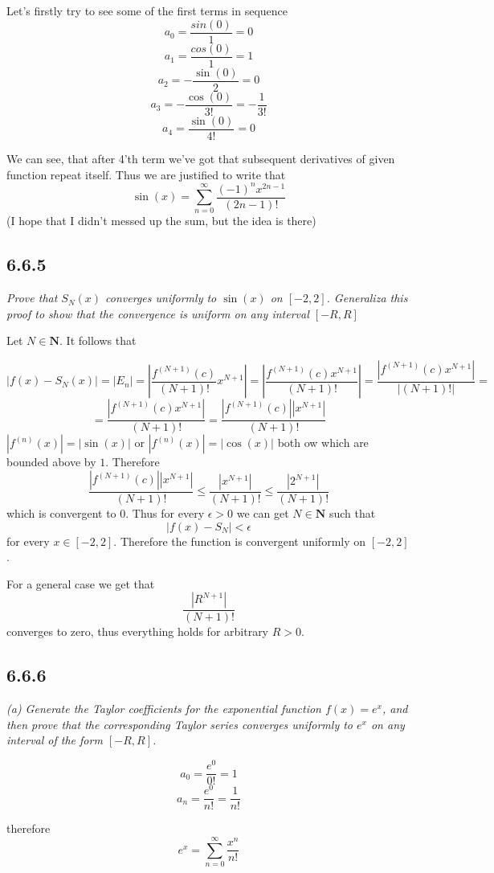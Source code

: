 \documentclass[11pt,oneside,titlepage]{book}
\begin{document}
Let's firstly try to see some of the first terms in sequence
$$a_0 = \frac{sin(0)}{1} = 0$$
$$a_1 = \frac{cos(0)}{1} = 1$$
$$a_2 = -\frac{\sin(0)}{2} = 0$$
$$a_3 = - \frac{\cos(0)}{3!} = - \frac{1}{3!}$$
$$a_4 = \frac{\sin(0)}{4!} = 0$$


We can see, that after 4'th term we've got that subsequent derivatives of
given function repeat itself. Thus we are justified to write that
$$\sin(x) = \sum_{n = 0}^{\infty}{\frac{(-1)^n x^{2n - 1}}{(2n - 1)!}}$$
(I hope that I didn't messed up the sum, but the idea is there)

\subsection*{6.6.5}
\textit{Prove that $S_N(x)$ converges uniformly to $\sin(x)$ on $[-2, 2]$.
  Generaliza this proof to show that the convergence is uniform on any interval
  $[-R, R]$}

Let $N \in \textbf{N}$. It follows that

$$|f(x) - S_N(x)| = |E_n| =
\left|\frac{f^{(N + 1)}(c)}{(N + 1)!}x^{N + 1}\right| =
\left|\frac{f^{(N + 1)}(c) x^{N + 1} }{(N + 1)!}\right| =
\frac{|f^{(N + 1)}(c) x^{N + 1}|}{|(N + 1)!|} =
$$
$$
= \frac{|f^{(N + 1)}(c) x^{N + 1}|}{(N + 1)!} =
\frac{|f^{(N + 1)}(c)|| x^{N + 1}|}{(N + 1)!}
$$
$|f^{(n)}(x)| = |\sin(x)|$ or $|f^{(n)}(x)| = |\cos(x)|$
both ow which are bounded  above by $1$. Therefore
$$
\frac{|f^{(N + 1)}(c)|| x^{N + 1}|}{(N + 1)!}
\leq
\frac{| x^{N + 1}|}{(N + 1)!} \leq
\frac{|2^{N + 1}|}{(N + 1)!}
$$
which is convergent to $0$. Thus for every $\epsilon > 0$ we can get
$N \in \textbf{N}$ such that
$$|f(x) - S_N| < \epsilon$$
for every $x \in [-2, 2]$. Therefore the function is convergent
uniformly on $[-2, 2]$.

For a general case we get that 
$$
\frac{|R^{N + 1}|}{(N + 1)!}
$$
converges to zero, thus everything holds for arbitrary $R > 0$.

\subsection*{6.6.6}
\textit{(a) Generate the Taylor coefficients for the exponential function
  $f(x) = e^x$, and then prove that the corresponding Taylor series
  converges uniformly to $e^x$ on any interval of the form $[-R, R]$.}

$$a_0 = \frac{e^0}{0!} = 1$$
$$a_n = \frac{e^0}{n!} = \frac{1}{n!}$$

therefore
$$e^x = \sum_{n = 0}^{\infty}{\frac{x^n}{n!}}$$
\end{document}
